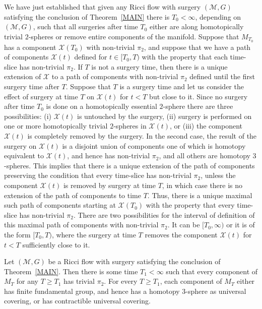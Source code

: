 We have just established that given any Ricci flow with surgery $({\mathcal
M},G)$ satisfying the conclusion of Theorem~\ref{MAIN} there is $T_0<\infty$,
depending  on $({\mathcal M},G)$, such that all surgeries after time $T_0$
either are along homotopically trivial $2$-spheres or remove entire components
of the manifold. Suppose that $M_{T_0}$ has a component ${\mathcal X}(T_0)$
with non-trivial $\pi_2$, and suppose that we have a path of components
${\mathcal X}(t)$ defined for $t\in [T_0,T)$ with the property that each
time-slice has non-trivial $\pi_2$. If $T$ is not a surgery time, then there is
a unique extension of ${\mathcal X}$ to a path of components with non-trivial
$\pi_2$ defined until the first surgery time after $T$. Suppose that $T$ is a
surgery time and let us consider the effect of surgery at time $T$ on
${\mathcal X}(t)$ for $t<T$ but close to it. Since no surgery after time $T_0$
is done on a homotopically essential $2$-sphere there are three possibilities:
(i) ${\mathcal X}(t)$ is untouched by the surgery, (ii) surgery is performed on
one or more homotopically trivial $2$-spheres in ${\mathcal X}(t)$, or (iii)
the component ${\mathcal X}(t)$ is completely removed by the surgery. In the
second case, the result of the surgery on ${\mathcal X}(t)$ is a disjoint union
of components one of which is homotopy equivalent to ${\mathcal X}(t)$, and
hence has non-trivial $\pi_2$, and all others are homotopy $3$-spheres. This
implies that there is a unique extension of the path of components preserving
the condition that every time-slice has non-trivial $\pi_2$, unless the
component ${\mathcal X}(t)$ is removed by surgery at time $T$, in which case
there is no extension of the path of components to time $T$. Thus, there is a
unique maximal such path of components starting at ${\mathcal X}(T_0)$ with the
property that every time-slice has non-trivial $\pi_2$. There are two
possibilities for the interval of definition of this maximal path of components
with non-trivial $\pi_2$. It can be $[T_0,\infty)$ or it is of the form
$[T_0,T)$, where the surgery at time $T$ removes the component ${\mathcal
X}(t)$ for $t<T$ sufficiently close to it.







\begin{proposition}
\label{prop:eventual-trivial-pi2}
\label{pi2}
Let $({\mathcal M},G)$ be a Ricci flow with surgery satisfying the conclusion
of Theorem~\ref{MAIN}. Then there is some time $T_1<\infty$ such that every
component of $M_T$ for any $T\ge T_1$ has trivial $\pi_2$. For every $T\ge
T_1$, each component of $M_T$ either has finite fundamental group, and hence
has a homotopy $3$-sphere as universal covering, or has  contractible universal
covering.
\end{proposition}

